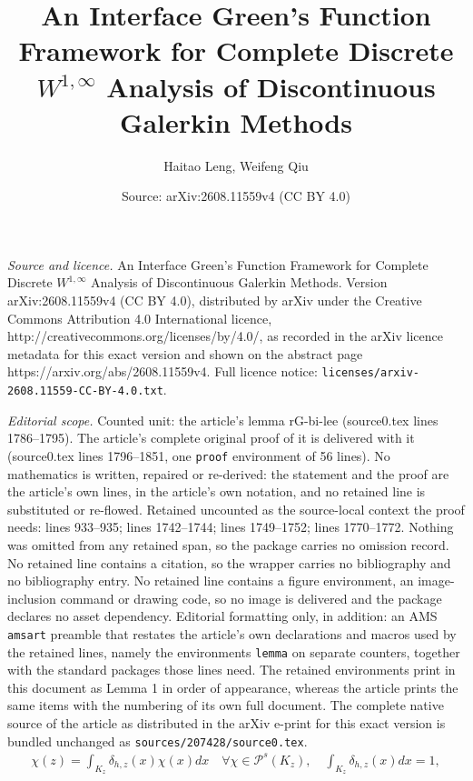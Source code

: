 \documentclass[10pt,a4paper]{amsart}
\title{An Interface Green's Function Framework for Complete Discrete $W^{1,\infty}$ Analysis of Discontinuous Galerkin Methods}
\author{Haitao Leng, Weifeng Qiu}
\date{Source: arXiv:2608.11559v4 (CC BY 4.0)}
\begin{document}
\maketitle

\noindent\emph{Source and licence.} An Interface Green's Function Framework for Complete Discrete $W^{1,\infty}$ Analysis of Discontinuous Galerkin Methods. Version arXiv:2608.11559v4 (CC BY 4.0), distributed by arXiv under the Creative Commons Attribution 4.0 International licence, http://creativecommons.org/licenses/by/4.0/, as recorded in the arXiv licence metadata for this exact version and shown on the abstract page https://arxiv.org/abs/2608.11559v4. Full licence notice: \texttt{licenses/arxiv-2608.11559-CC-BY-4.0.txt}.\par\smallskip

\noindent\textit{Editorial scope.} Counted unit: the article's lemma rG-bi-lee (source0.tex lines 1786--1795). The article's complete original proof of it is delivered with it (source0.tex lines 1796--1851, one \texttt{proof} environment of 56 lines). No mathematics is written, repaired or re-derived: the statement and the proof are the article's own lines, in the article's own notation, and no retained line is substituted or re-flowed.  Retained uncounted as the source-local context the proof needs: lines 933--935; lines 1742--1744; lines 1749--1752; lines 1770--1772.  Nothing was omitted from any retained span, so the package carries no omission record.  No retained line contains a citation, so the wrapper carries no bibliography and no bibliography entry.  No retained line contains a figure environment, an image-inclusion command or drawing code, so no image is delivered and the package declares no asset dependency.  Editorial formatting only, in addition: an AMS \texttt{amsart} preamble that restates the article's own declarations and macros used by the retained lines, namely the environments \texttt{lemma} on separate counters, together with the standard packages those lines need.  The retained environments print in this document as Lemma 1 in order of appearance, whereas the article prints the same items with the numbering of its own full document.  The complete native source of the article as distributed in the arXiv e-print for this exact version is bundled unchanged as \texttt{sources/207428/source0.tex}.
\begin{align}
\chi(z)=\int_{K_z}\delta_{h,z}(x)\chi(x)dx\quad \forall \chi\in \mathcal{P}^s(K_z),\quad \int_{K_z}\delta_{h,z}(x)dx=1,\label{ddd:1}
\end{align}
\end{document}
